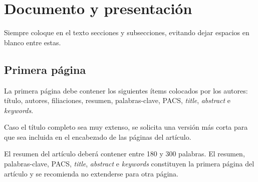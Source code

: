 \documentclass[12pt, a4paper, twoside, twocolumn]{article}
\begin{document}
\section{Documento y presentación}

Siempre coloque en el texto secciones y subsecciones, evitando dejar espacios en blanco entre estas.

\subsection{Primera página}

La primera página debe contener los siguientes ítems colocados por los autores: título, autores, filiaciones, resumen, palabras-clave, PACS, \textit{title}, \textit{abstract} e \textit{keywords}. 
%

Caso el título completo sea muy extenso, se solicita una versión más corta para que sea incluida en el encabezado de las páginas del artículo.

El resumen del artículo deberá contener entre 180 y 300 palabras. El resumen, palabras-clave, PACS, \textit{title}, \textit{abstract} e \textit{keywords} constituyen la primera página del artículo y se recomienda no extenderse para otra página.
\end{document}
